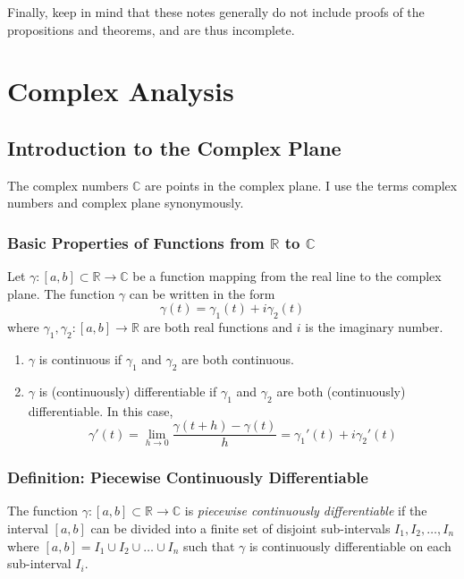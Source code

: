 \documentclass[11pt, a4paper]{article}
\newcommand{\R}{\mathbb{R}} %
\newcommand{\C}{\mathbb{C}} %
\begin{document}
\vspace{2mm}
Finally, keep in mind that these notes generally do not include proofs of the propositions and theorems, and are thus incomplete.

\newpage

\tableofcontents

\newpage

\pagestyle{headerstyle}
\section{Complex Analysis}

\subsection{Introduction to the Complex Plane}

The complex numbers $ \C $ are points in the complex plane. I use the terms complex numbers and complex plane synonymously.

\subsubsection{Basic Properties of Functions from $ \R $ to $ \C $}
Let $ \gamma : [a, b] \subset \R \to \C $ be a function mapping from the real line to the complex plane. The function $ \gamma $ can be written in the form
\begin{equation*}
	\gamma(t) = \gamma_1(t) + i \gamma_2(t)
\end{equation*}
where $ \gamma_1, \gamma_2 : [a, b] \to \R $ are both real functions and $ i $ is the imaginary number.

\begin{enumerate}
	\item $ \gamma $ is continuous if $ \gamma_1 $ and $ \gamma_2 $ are both continuous.
	\item $ \gamma $ is (continuously) differentiable if $ \gamma_1 $ and $ \gamma_2 $ are both (continuously) differentiable. In this case,
	\begin{equation*}
		\gamma'(t) = \lim_{h \to 0} \frac{\gamma(t + h) - \gamma(t)}{h} = \gamma_1'(t) + i \gamma_2'(t)
	\end{equation*}
\end{enumerate}

\subsubsection{Definition: Piecewise Continuously Differentiable}
The function $ \gamma : [a, b] \subset \R \to \C $ is \textit{piecewise continuously differentiable} if the interval $ [a, b] $ can be divided into a finite set of disjoint sub-intervals $ I_1, I_2, \dots, I_n $ where $ [a, b] = I_1 \cup  I_2 \cup \dots \cup I_n $ such that $ \gamma $ is continuously differentiable on each sub-interval $ I_i $.
\end{document}
